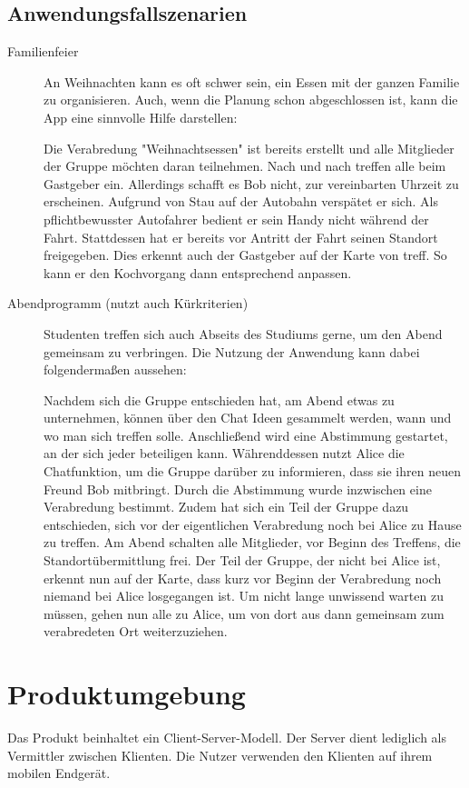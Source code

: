 \documentclass[parskip=full,11pt]{scrartcl}
\begin{document}
\subsection{Anwendungsfallszenarien}
\begin{description}
\item[Familienfeier]
An Weihnachten kann es oft schwer sein, ein Essen mit der ganzen Familie zu organisieren.
Auch, wenn die Planung schon abgeschlossen ist, kann die App eine sinnvolle Hilfe darstellen:

Die Verabredung "Weihnachtsessen" ist bereits erstellt und alle Mitglieder der Gruppe möchten daran teilnehmen.
Nach und nach treffen alle beim Gastgeber ein. Allerdings schafft es Bob nicht, zur vereinbarten Uhrzeit zu erscheinen.
Aufgrund von Stau auf der Autobahn verspätet er sich.
Als pflichtbewusster Autofahrer bedient er sein Handy nicht während der Fahrt.
Stattdessen hat er bereits vor Antritt der Fahrt seinen Standort freigegeben.
Dies erkennt auch der Gastgeber auf der Karte von treff. So kann er den Kochvorgang dann entsprechend anpassen.

\item[Abendprogramm (nutzt auch Kürkriterien)]
Studenten treffen sich auch Abseits des Studiums gerne, um den Abend gemeinsam zu verbringen.
Die Nutzung der Anwendung kann dabei folgendermaßen aussehen:

Nachdem sich die Gruppe entschieden hat, am Abend etwas zu unternehmen,
können über den Chat Ideen gesammelt werden, wann und wo man sich treffen solle.
Anschließend wird eine Abstimmung gestartet, an der sich jeder beteiligen kann.
Währenddessen nutzt Alice die Chatfunktion, um die Gruppe darüber zu informieren, dass sie ihren neuen Freund Bob mitbringt.
Durch die Abstimmung wurde inzwischen eine Verabredung bestimmt.
Zudem hat sich ein Teil der Gruppe dazu entschieden, sich vor der eigentlichen Verabredung noch bei Alice zu Hause zu treffen.
Am Abend schalten alle Mitglieder, vor Beginn des Treffens, die Standortübermittlung frei.
Der Teil der Gruppe, der nicht bei Alice ist, erkennt nun auf der Karte,
dass kurz vor Beginn der Verabredung noch niemand bei Alice losgegangen ist.
Um nicht lange unwissend warten zu müssen,
gehen nun alle zu Alice, um von dort aus dann gemeinsam zum verabredeten Ort weiterzuziehen.
\end{description}

\pagebreak
\section{Produktumgebung}
Das Produkt beinhaltet ein Client-Server-Modell.
Der Server dient lediglich als Vermittler zwischen Klienten.
Die Nutzer verwenden den Klienten auf ihrem mobilen Endgerät.
\end{document}
